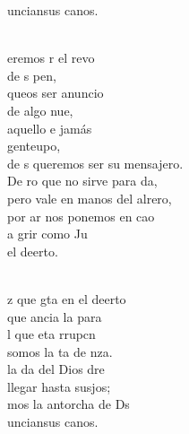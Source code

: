 \begin{cancion}
\begin{chorus}
	unciansus canos.   \\
	\end{chorus}%
	\jump\\
	eremos r el revo \\
	de s pen,   \\
	queos ser anuncio\\
	de algo nue,   \\
	 aquello e jamás \\
	 genteupo,    \\
	de s queremos ser su mensajero.\\
	De ro que no sirve para da,\\
	pero  vale en manos del alrero,\\
	por ar nos ponemos en cao\\
	a grir como Ju  \\
	el deerto.   \\\jump\\
	\begin{chorus}%
	z que gta en el deerto  \\
	 que ancia la para\\
	l que eta rrupcn \\
	somos la ta de nza.   \\
	 la da del Dios dre   \\
	 llegar hasta susjos;\\
	mos la antorcha de Ds\\
	unciansus canos.   \\
	\end{chorus}%
	\jump\\
\end{cancion}%
